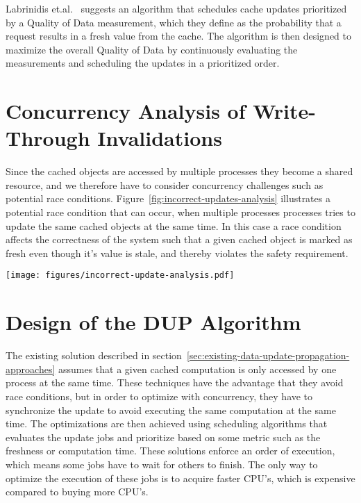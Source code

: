 Labrinidis et.al.~\cite{paper:update-propagation-strategies} suggests an algorithm that schedules cache updates prioritized by a Quality of Data measurement, which they define as the probability that a request results in a fresh value from the cache. The algorithm is then designed to maximize the overall Quality of Data by continuously evaluating the measurements and scheduling the updates in a prioritized order.


\section{Concurrency Analysis of Write-Through Invalidations}
\label{sec:race-condition-on-write-through-invalidation}
Since the cached objects are accessed by multiple processes they become a shared resource, and we therefore have to consider concurrency challenges such as potential race conditions. Figure~\ref{fig:incorrect-updates-analysis} illustrates a potential race condition that can occur, when multiple processes processes tries to update the same cached objects at the same time. In this case a race condition affects the correctness of the system such that a given cached object is marked as fresh even though it's value is stale, and thereby violates the safety requirement.

\begin{figure*}[ht!]
  \centering
  \texttt{[image: figures/incorrect-update-analysis.pdf]}
  \caption{Showing how two concurrent caching updates from two different application servers results in an inconsistent state. We see that even though the request from \emph{Update Process 2} are based on data older than \emph{Update Process 1} it gets to write.}
  \label{fig:incorrect-updates-analysis}
\end{figure*}


\section{Design of the DUP Algorithm}
\label{sec:the-data-update-propagation-algorithm}
The existing solution described in section~\ref{sec:existing-data-update-propagation-approaches} assumes that a given cached computation is only accessed by one process at the same time. These techniques have the advantage that they avoid race conditions, but in order to optimize with concurrency, they have to synchronize the update to avoid executing the same computation at the same time. The optimizations are then achieved using scheduling algorithms that evaluates the update jobs and prioritize based on some metric such as the freshness or computation time. These solutions enforce an order of execution, which means some jobs have to wait for others to finish. The only way to optimize the execution of these jobs is to acquire faster CPU's, which is expensive compared to buying more CPU's.

